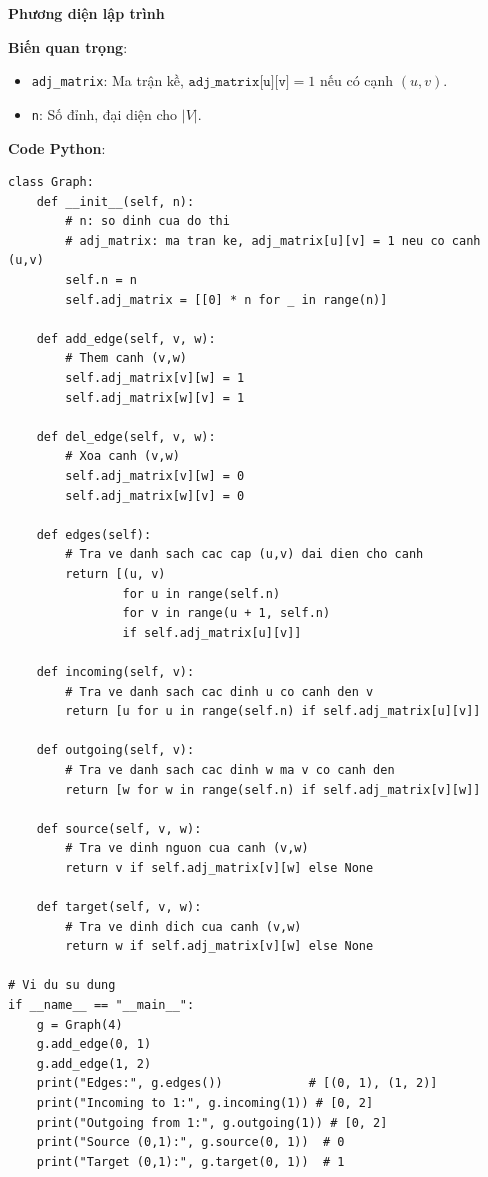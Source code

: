 \documentclass[a4paper,12pt]{article}
\begin{document}
\textbf{Phương diện lập trình}

\textbf{Biến quan trọng}:
\begin{itemize}
    \item \texttt{adj\_matrix}: Ma trận kề, \( \texttt{adj\_matrix[u][v]} = 1\) nếu có cạnh \((u,v)\).
    \item \texttt{n}: Số đỉnh, đại diện cho \(\lvert V\rvert\).
\end{itemize}

\textbf{Code Python}:
\lstset{language=Python}
\begin{lstlisting}
class Graph:
    def __init__(self, n):
        # n: so dinh cua do thi
        # adj_matrix: ma tran ke, adj_matrix[u][v] = 1 neu co canh (u,v)
        self.n = n
        self.adj_matrix = [[0] * n for _ in range(n)]

    def add_edge(self, v, w):
        # Them canh (v,w)
        self.adj_matrix[v][w] = 1
        self.adj_matrix[w][v] = 1

    def del_edge(self, v, w):
        # Xoa canh (v,w)
        self.adj_matrix[v][w] = 0
        self.adj_matrix[w][v] = 0

    def edges(self):
        # Tra ve danh sach cac cap (u,v) dai dien cho canh
        return [(u, v)
                for u in range(self.n)
                for v in range(u + 1, self.n)
                if self.adj_matrix[u][v]]

    def incoming(self, v):
        # Tra ve danh sach cac dinh u co canh den v
        return [u for u in range(self.n) if self.adj_matrix[u][v]]

    def outgoing(self, v):
        # Tra ve danh sach cac dinh w ma v co canh den
        return [w for w in range(self.n) if self.adj_matrix[v][w]]

    def source(self, v, w):
        # Tra ve dinh nguon cua canh (v,w)
        return v if self.adj_matrix[v][w] else None

    def target(self, v, w):
        # Tra ve dinh dich cua canh (v,w)
        return w if self.adj_matrix[v][w] else None

# Vi du su dung
if __name__ == "__main__":
    g = Graph(4)
    g.add_edge(0, 1)
    g.add_edge(1, 2)
    print("Edges:", g.edges())            # [(0, 1), (1, 2)]
    print("Incoming to 1:", g.incoming(1)) # [0, 2]
    print("Outgoing from 1:", g.outgoing(1)) # [0, 2]
    print("Source (0,1):", g.source(0, 1))  # 0
    print("Target (0,1):", g.target(0, 1))  # 1
\end{lstlisting}
\end{document}
